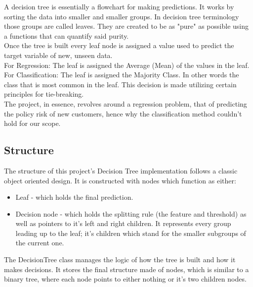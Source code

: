 A decision tree is essentially a flowchart for making predictions. It works by sorting the data into smaller and smaller groups. In decision tree terminology those groups are called leaves. They are created to be as "pure" as possible using a functions that can quantify said purity.\\
Once the tree is built every leaf node is assigned a value used to predict the target variable of new, unseen data.\\
For Regression: The leaf is assigned the Average (Mean) of the values in the leaf.\\
For Classification: The leaf is assigned the Majority Class. In other words the class that is most common in the leaf. This decision is made utilizing certain principles for tie-breaking.\\
The project, in essence, revolves around a regression problem, that of predicting the policy risk of new customers, hence why the classification method couldn't hold for our scope.


\subsection{Structure}
The structure of this project's Decision Tree implementation follows a classic object oriented design. It is constructed with nodes which function as either:\\
\begin{itemize}
\setlength{\parskip}{0pt}

\item Leaf - which holds the final prediction.\\
\item Decision node - which holds the splitting rule (the feature and threshold) as well as pointers to it's left and right children. It represents every group leading up to the leaf; it's children which stand for the smaller subgroups of the current one.\\
\end{itemize}
The DecisionTree class manages the logic of how the tree is built and how it makes decisions. It stores the final structure made of nodes, which is similar to a binary tree, where each node points to either nothing or it's two children nodes.\\

